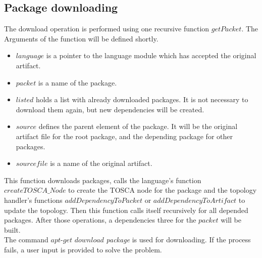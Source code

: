 \subsection*{Package downloading}
The download operation is performed using one recursive function $getPacket$. %
The Arguments of the function will be defined shortly.
\begin{itemize}
	\item $language$ is a pointer to the language module which has accepted the original artifact.
	\item $packet$ is a name of the package.
	\item $listed$ holds a list with already downloaded packages.
	 It is not necessary to download them again, but new dependencies will be created.
	\item $source$ defines the parent element of the package. 
	It will be the original artifact file for the root package, and the depending package for other packages.
	\item $sourcefile$ is a name of the original artifact.
\end{itemize}
This function downloads packages, calls the language's function $createTOSCA\_Node$ to create the TOSCA node for the package and the topology handler's functions $addDependencyToPacket$ or $addDependencyToArtifact$ to update the topology. Then this function calls itself recursively for all depended packages.
After those operations, a dependencies three for the $packet$ will be built.\\
The command $apt$-$get$ $download$ \emph{package} is used for downloading. 
If the process fails, a user input is provided to solve the problem. 

